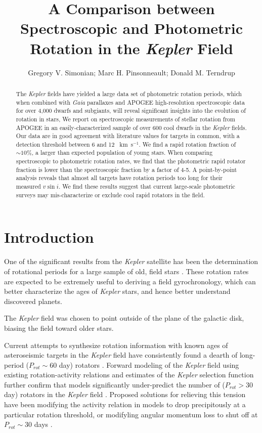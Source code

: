\documentclass[manuscript]{aastex6}
\newcommand{\vsini}{\ensuremath{v \sin i}}
\newcommand{\Kepler}{\mbox{\textit{Kepler}}}
\newcommand{\Gaia}{\mbox{\textit{Gaia}}}
\newcommand{\kms}{\textrm{~km~s}\ensuremath{^{-1}}}
\begin{document}
\title{A Comparison between Spectroscopic and Photometric Rotation in the
\Kepler{} Field}
\author{Gregory V. Simonian; Marc H. Pinsonneault; Donald M. Terndrup}

\begin{abstract}
    The \Kepler{} fields have yielded a large data set of photometric rotation
    periods, which when combined with \Gaia{} parallaxes and APOGEE
    high-resolution spectroscopic data for over 4,000 dwarfs and subgiants, 
    will reveal significant insights into the evolution of rotation in stars, 
    We report on 
    spectroscopic measurements of stellar rotation from APOGEE in an
    easily-characterized sample of over 600 cool dwarfs in the
    \Kepler{} fields. Our data are in good agreement with literature values for
    targets in common, with a detection threshold between 6 and 12 \kms. We
    find a rapid rotation fraction of \(\sim 10\%\), a larger than expected
    population of young stars. When comparing spectroscopic to photometric
    rotation rates, we find that the photometric rapid rotator fraction is
    lower than the spectroscopic fraction by a factor of 4-5. A point-by-point
    analysis reveals that almost all targets have rotation periods too long for
    their measured \vsini{}. We find these results suggest that current 
    large-scale photometric surveys may mis-characterize or exclude cool rapid 
    rotators in the field. 
\end{abstract}

\section{Introduction}

One of the significant results from the \Kepler{} satellite has been the
determination of rotational periods for a large sample of old, field stars
\citep{Basri11,Affer12,Nielsen13,Reinhold13,McQuillan14,Garcia14}.
These rotation rates are expected to be extremely useful to deriving a field
gyrochronology, which can better characterize the ages of
\Kepler{} stars, and hence better understand discovered planets.

The \Kepler{} field was chosen to point outside of the plane of the galactic
disk, biasing the field toward older stars. 

Current attempts to synthesize rotation information with known ages of
asteroseismic targets in the \Kepler{} field have consistently found a dearth
of long-period (\(P_{rot} \sim 60\) day) rotators \citet{Angus15,vanSaders16}. 
Forward modeling of the \Kepler{} field using existing rotation-activity
relations and estimates of the \Kepler{} selection function further confirm 
that models significantly under-predict the number of (\(P_{rot} > 30\) day) 
rotators in the \Kepler{} field \citep{vanSaders18}. Proposed solutions for 
relieving this tension have been modifying the activity relation in models to 
drop precipitously at a particular rotation threshold, or modifyling angular 
momentum loss to shut off at \(P_{rot} \sim 30\) days \citep{vanSaders18}.
\end{document}

